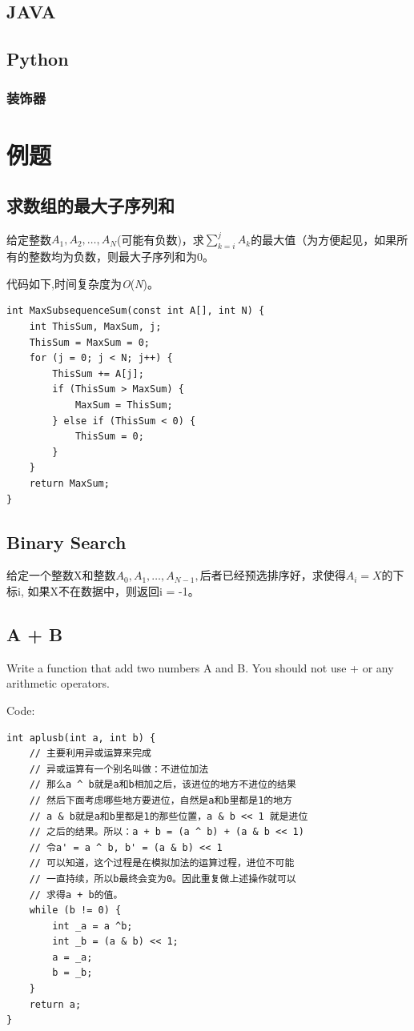 \documentclass[12pt]{article}  %
\begin{document}
\subsection{JAVA}

\subsection{Python}

\subsubsection{装饰器}

\section{例题}

\subsection{求数组的最大子序列和}

给定整数$A_1,A_2,\ldots,A_N$(可能有负数)，求$\sum_{k=i}^jA_k$的最大值（为方便起见，如果所有的整数均为负数，则最大子序列和为0。

代码如下,时间复杂度为\emph{O}(\emph{N})。
{\setmainfont{Menlo}
\begin{lstlisting}
int MaxSubsequenceSum(const int A[], int N) {
    int ThisSum, MaxSum, j;
    ThisSum = MaxSum = 0;
    for (j = 0; j < N; j++) {
        ThisSum += A[j];
        if (ThisSum > MaxSum) {
            MaxSum = ThisSum;
        } else if (ThisSum < 0) {
            ThisSum = 0;
        }
    }
    return MaxSum;
}
\end{lstlisting}}

\subsection{Binary Search}

给定一个整数X和整数$A_0,A_1,\ldots,A_{N-1},$后者已经预选排序好，求使得$A_i = X$的下标i,
如果X不在数据中，则返回i = -1。

\subsection{A + B}

Write a function that add two numbers A and B. You should not use + or any arithmetic operators.

Code:
{\setmainfont{Menlo}
\begin{lstlisting}
int aplusb(int a, int b) {
    // 主要利用异或运算来完成
    // 异或运算有一个别名叫做：不进位加法
    // 那么a ^ b就是a和b相加之后，该进位的地方不进位的结果
    // 然后下面考虑哪些地方要进位，自然是a和b里都是1的地方
    // a & b就是a和b里都是1的那些位置，a & b << 1 就是进位
    // 之后的结果。所以：a + b = (a ^ b) + (a & b << 1)
    // 令a' = a ^ b, b' = (a & b) << 1
    // 可以知道，这个过程是在模拟加法的运算过程，进位不可能
    // 一直持续，所以b最终会变为0。因此重复做上述操作就可以
    // 求得a + b的值。
    while (b != 0) {
        int _a = a ^b;
        int _b = (a & b) << 1;
        a = _a;
        b = _b;
    }
    return a;
}
\end{lstlisting}}
\end{document}
